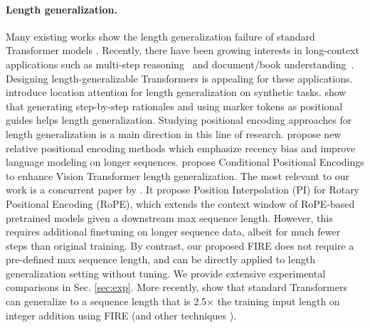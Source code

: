 \paragraph{Length generalization.} Many existing works show the length
generalization failure of standard Transformer models \citep{press2022train,anil2022exploring, deletang2023neural,liu2024exposing}. Recently, there have been growing interests in long-context applications such as multi-step reasoning~\citep{wei2022chain,dziri2023faith,zhao2023complex} and document/book understanding~\citep{kovcisky2018narrativeqa,ke2022continual,guo2022longt5,ainslie2023colt5,liu2023lost}. Designing length-generalizable Transformers is appealing for these applications. 
\citet{dubois2020location,chowdhury2023monotonic} introduce location attention for length generalization on synthetic tasks. 
\citet{bueno2022induced} show that generating step-by-step rationales and using marker tokens as positional guides helps length generalization. 
Studying positional encoding approaches for length generalization is a main direction in this line of research. \citet{press2022train,chi2022kerple,chi2023dissecting} propose new relative positional encoding methods which emphasize recency bias and improve language modeling on longer sequences. \citet{chu2023conditional} propose Conditional Positional Encodings to enhance Vision Transformer length generalization. The most relevant to our work is a concurrent paper by \citet{chen2023extending}. It propose Position Interpolation (PI) for Rotary Positional Encoding (RoPE), which extends the context window of RoPE-based pretrained models given a downstream max sequence length. 
However, this requires additional finetuning on longer sequence data, albeit for much fewer steps than original training. By contrast, our proposed FIRE does not require a pre-defined max sequence length, and can be directly applied to length generalization setting without tuning. We provide extensive experimental comparisons in Sec. \ref{sec:exp}. More recently, \citet{zhou2024transformers} show that standard Transformers can generalize to a sequence length that is 2.5$\times$ the training input length on integer addition using FIRE (and other techniques \citep{ruoss2023randomized, zhou2023algorithms}).

